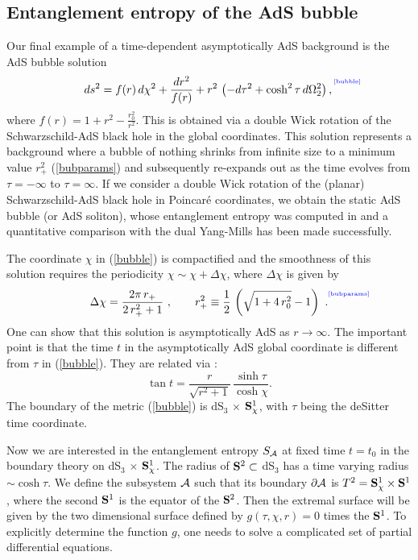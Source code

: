\documentclass[12pt]{article}
\newcommand{\be}{\begin{equation}}
\newcommand{\ee}{\end{equation}}
\def\req#1{(\ref{#1})}
\def\({\left (}
\def\){\right )}
\def\p{\partial}
\def\s{\sigma}
\def\CA{{\cal A}}
\def\Sp{{\bf S}}
\def\p{\partial}
\def\f#1#2{{\frac{#1}{#2}}}
\def\f#1#2{{\frac{#1}{#2}}}
\def\p{\partial}
\def\Label#1{\label{#1}%
{ \color{blue}{\smash{\hbox to0pt{\raise2ex\hbox{\tiny[#1]}\hss}}}}}
\def\rA{\CA}
\def\brA{\p \CA}
\def\s{\sqrt}
\def\f {\frac}
\begin{document}
\subsection{Entanglement entropy of the AdS bubble}

Our final example of a time-dependent asymptotically AdS background
is the AdS bubble solution \cite{Birmingham:2002st,
Balasubramanian:2002am}
%
\begin{equation}
ds^2=f(r) \, d\chi^2+\f{dr^2}{f(r)}+r^2 \, \(-d\tau^2+\cosh^2 \tau
\, d\Omega_2^2\), \Label{bubble}
\end{equation}
%
where $f(r)=1+ r^2-\f{r_0^2}{r^2}$. This is obtained via a double
Wick rotation of the Schwarzschild-AdS black hole in the global
coordinates. This solution represents a background where a bubble of
nothing shrinks from infinite size to a minimum value $r_+^2$
\req{bubparams} and subsequently re-expands out as the time evolves
from $\tau=-\infty$ to $\tau=\infty$. If we consider a double Wick
rotation of the  (planar) Schwarzschild-AdS black hole in Poincar\'e
coordinates, we obtain the static AdS bubble (or AdS soliton), whose
entanglement entropy was computed in \cite{Nishioka:2006gr} and a
quantitative comparison with the dual Yang-Mills has been made
successfully.

The coordinate $\chi$ in \req{bubble} is compactified and the
smoothness of this solution requires the periodicity $\chi\sim
\chi+\Delta\chi$, where $\Delta\chi$ is given by
%
\be
\Delta\chi=\f{2\pi \, r_+}{2\,r_+^2+1 } \ , \qquad
r^2_+\equiv
\f{1}{2}\, \left(\s{1+4\, r_0^2}-1\right) \ .
\Label{bubparams}
 \ee
%
One can show that this solution is asymptotically AdS as
$r\to\infty$. The important point is that the time $t$ in the
asymptotically AdS global coordinate is different from $\tau$ in
\req{bubble}. They are related via \cite{Balasubramanian:2002am}:
%
 \be \tan t=\f{r}{\s{r^2+1}}\, \f{\sinh \tau}{\cosh \chi}.
\ee
%
The boundary of the metric \req{bubble} is dS$_3$ $\times$ $\Sp^1_\chi$,
with $\tau$ being the deSitter time coordinate.

Now we are interested in the entanglement entropy $S_{\rA}$ at fixed
time $t=t_0$ in the boundary theory on dS$_3$ $\times$ $\Sp^1_\chi$.
The radius of $\Sp^2 \subset$ dS$_3$ has a time varying radius
$\sim\cosh \tau$. We define the subsystem $\rA$ such that its
boundary $\brA$ is $T^2=\Sp^1_{\chi}\times \Sp^1$, where the second
$\Sp^1$ is the equator of the $\Sp^2$. Then the extremal surface
will be given by the two dimensional surface defined by
$g(\tau,\chi,r)=0$ times the $\Sp^1$.  To explicitly determine the
function $g$, one needs  to solve a complicated set of partial
differential equations.
\end{document}
